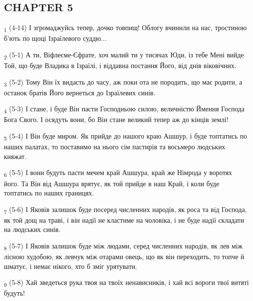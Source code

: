 \subsection{CHAPTER 5}
\begin{tcolorbox}
\textsubscript{1} (4-14) І згромаджуйсь тепер, дочко товпищ! Облогу вчинили на нас, тростиною б'ють по щоці Ізраїлевого суддю...
\end{tcolorbox}
\begin{tcolorbox}
\textsubscript{2} (5-1) А ти, Віфлеєме-Єфрате, хоч малий ти у тисячах Юди, із тебе Мені вийде Той, що буде Владика в Ізраїлі, і віддавна постання Його, від днів віковічних.
\end{tcolorbox}
\begin{tcolorbox}
\textsubscript{3} (5-2) Тому Він їх видасть до часу, аж поки ота не породить, що має родити, а останок братів Його вернеться до Ізраїлевих синів.
\end{tcolorbox}
\begin{tcolorbox}
\textsubscript{4} (5-3) І стане, і буде Він пасти Господньою силою, величністю Ймення Господа Бога Свого. І осядуть вони, бо Він стане великий тепер аж до кінців землі!
\end{tcolorbox}
\begin{tcolorbox}
\textsubscript{5} (5-4) І Він буде миром. Як прийде до нашого краю Ашшур, і буде топтатись по наших палатах, то поставимо на нього сім пастирів та восьмеро людських княжат.
\end{tcolorbox}
\begin{tcolorbox}
\textsubscript{6} (5-5) І вони будуть пасти мечем край Ашшура, край же Німрода у воротях його. Та Він від Ашшура врятує, як той прийде в наш Край, і коли буде топтатись по наших границях.
\end{tcolorbox}
\begin{tcolorbox}
\textsubscript{7} (5-6) І Яковів залишок буде посеред численних народів, як роса та від Господа, як той дощ на траві, і він надії не кластиме на чоловіка, і не буде надії складати на людських синів.
\end{tcolorbox}
\begin{tcolorbox}
\textsubscript{8} (5-7) І Яковів залишок буде між людами, серед численних народів, як лев між лісною худобою, як левчук між отарами овець, що як він переходить, то топче й шматує, і немає нікого, хто б зміг урятувати.
\end{tcolorbox}
\begin{tcolorbox}
\textsubscript{9} (5-8) Хай зведеться рука твоя на твоїх ненависників, і хай всі вороги твої витяті будуть!
\end{tcolorbox}
